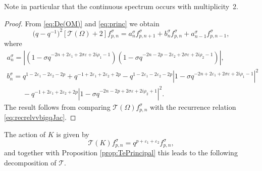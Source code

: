 \documentclass[pdftex]{sigma}
\numberwithin{equation}{section}
\numberwithin{theorem}{section}
\numberwithin{proposition}{section}
\numberwithin{lemma}{section}
\numberwithin{corollary}{section}
\numberwithin{definition}{section}
\numberwithin{example}{section}
\numberwithin{remark}{section}
\numberwithin{note}{section}
\newcommand{\eps}{\varepsilon}
\begin{document}
Note in particular that the continuous spectrum occurs with multiplicity~2.
\begin{proof}
From \eqref{eq:De(OM)} and \eqref{eq:princ} we obtain
\[
\big(q-q^{-1}\big)^2 [\mathcal T(\Omega)+2 ]f_{p,n}^\sigma = a_n^\sigma f_{p,n+1}^\sigma + b_n^\sigma f_{p,n}^\sigma + a_{n-1}^\sigma f_{p,n-1}^\sigma,
\]
where
\begin{gather*}
a_n^\sigma = \left|(1-\sigma q^{-2n+2\eps_1+2\sigma\eps+2i\rho_1-1})(1-\sigma q^{-2n-2p-2\eps_2+2\sigma\eps+2i\rho_2-1})\right|,\\
b_n^\sigma  = q^{1-2\eps_1-2\eps_2-2p}+q^{-1+2\eps_1+2\eps_2+2p}-q^{1-2\eps_1-2\eps_2-2p}\left|1-\sigma q^{-2n+2\eps_1+2\sigma\eps+2i\rho_1-1} \right|^2\\
\phantom{b_n^\sigma  =}{} -q^{-1+2\eps_1+2\eps_2+2p}\left| 1-\sigma q^{-2n-2p+2\sigma\eps+2i\rho_2+1}\right|^2.
\end{gather*}
The result follows from comparing $\mathcal T(\Omega)f_{p,n}^\sigma$ with the recurrence relation \eqref{eq:recrelvvbigqJac}.
\end{proof}

The action of $K$ is given by
\[
\mathcal T(K) f_{p,n}^\sigma = q^{p+\eps_1+\eps_2} f_{p,n}^\sigma,
\]
and together with Proposition \ref{prop:TePrincipal} this leads to the following decomposition of $\mathcal T$.
\end{document}
